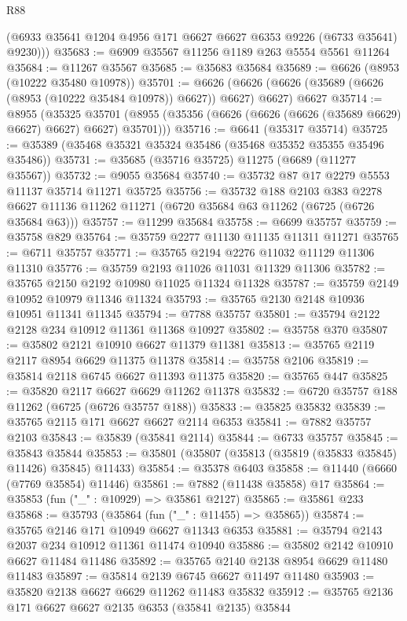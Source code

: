 \begin{lexlean}{R88}
\begin{coremodule}
        (@6933 @35641 @1204 @4956 @171 @6627 @6627 @6353 @9226 (@6733 @35641) @9230)))
@35683 := @6909 @35567 @11256 @1189 @263 @5554 @5561 @11264
@35684 := @11267 @35567
@35685 := @35683 @35684
@35689 := @6626 (@8953 (@10222 @35480 @10978))
@35701 := @6626
    (@6626 (@6626 (@35689 (@6626 (@8953 (@10222 @35484 @10978)) @6627)) @6627) @6627)
    @6627
@35714 := @8955
    (@35325 @35701 (@8955 (@35356 (@6626 (@6626 (@6626 (@35689 @6629) @6627) @6627) @6627) @35701)))
@35716 := @6641 (@35317 @35714)
@35725 := @35389 (@35468 @35321 @35324 @35486 (@35468 @35352 @35355 @35496 @35486))
@35731 := @35685 (@35716 @35725) @11275 (@6689 (@11277 @35567))
@35732 := @9055 @35684
@35740 := @35732 @87 @17 @2279 @5553 @11137 @35714 @11271 @35725
@35756 := @35732
    @188
    @2103
    @383
    @2278
    @6627
    @11136
    @11262
    @11271
    (@6720 @35684 @63 @11262 (@6725 (@6726 @35684 @63)))
@35757 := @11299 @35684
@35758 := @6699 @35757
@35759 := @35758 @829
@35764 := @35759 @2277 @11130 @11135 @11311 @11271
@35765 := @6711 @35757
@35771 := @35765 @2194 @2276 @11032 @11129 @11306 @11310
@35776 := @35759 @2193 @11026 @11031 @11329 @11306
@35782 := @35765 @2150 @2192 @10980 @11025 @11324 @11328
@35787 := @35759 @2149 @10952 @10979 @11346 @11324
@35793 := @35765 @2130 @2148 @10936 @10951 @11341 @11345
@35794 := @7788 @35757
@35801 := @35794 @2122 @2128 @234 @10912 @11361 @11368 @10927
@35802 := @35758 @370
@35807 := @35802 @2121 @10910 @6627 @11379 @11381
@35813 := @35765 @2119 @2117 @8954 @6629 @11375 @11378
@35814 := @35758 @2106
@35819 := @35814 @2118 @6745 @6627 @11393 @11375
@35820 := @35765 @447
@35825 := @35820 @2117 @6627 @6629 @11262 @11378
@35832 := @6720 @35757 @188 @11262 (@6725 (@6726 @35757 @188))
@35833 := @35825 @35832
@35839 := @35765 @2115 @171 @6627 @6627 @2114 @6353
@35841 := @7882 @35757 @2103
@35843 := @35839 (@35841 @2114)
@35844 := @6733 @35757
@35845 := @35843 @35844
@35853 := @35801 (@35807 (@35813 (@35819 (@35833 @35845) @11426) @35845) @11433)
@35854 := @35378 @6403
@35858 := @11440 (@6660 (@7769 @35854) @11446)
@35861 := @7882 (@11438 @35858) @17
@35864 := @35853 (fun ("_" : @10929) => @35861 @2127)
@35865 := @35861 @233
@35868 := @35793 (@35864 (fun ("_" : @11455) => @35865))
@35874 := @35765 @2146 @171 @10949 @6627 @11343 @6353
@35881 := @35794 @2143 @2037 @234 @10912 @11361 @11474 @10940
@35886 := @35802 @2142 @10910 @6627 @11484 @11486
@35892 := @35765 @2140 @2138 @8954 @6629 @11480 @11483
@35897 := @35814 @2139 @6745 @6627 @11497 @11480
@35903 := @35820 @2138 @6627 @6629 @11262 @11483 @35832
@35912 := @35765 @2136 @171 @6627 @6627 @2135 @6353 (@35841 @2135) @35844

\end{coremodule}
\end{lexlean}

